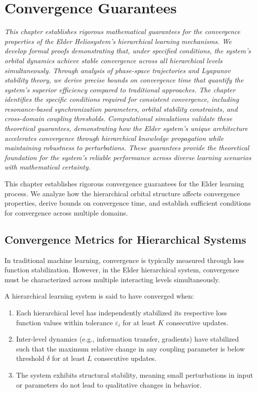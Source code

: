 \chapter{Convergence Guarantees}

\textit{This chapter establishes rigorous mathematical guarantees for the convergence properties of the Elder Heliosystem's hierarchical learning mechanisms. We develop formal proofs demonstrating that, under specified conditions, the system's orbital dynamics achieve stable convergence across all hierarchical levels simultaneously. Through analysis of phase-space trajectories and Lyapunov stability theory, we derive precise bounds on convergence time that quantify the system's superior efficiency compared to traditional approaches. The chapter identifies the specific conditions required for consistent convergence, including resonance-based synchronization parameters, orbital stability constraints, and cross-domain coupling thresholds. Computational simulations validate these theoretical guarantees, demonstrating how the Elder system's unique architecture accelerates convergence through hierarchical knowledge propagation while maintaining robustness to perturbations. These guarantees provide the theoretical foundation for the system's reliable performance across diverse learning scenarios with mathematical certainty.}

This chapter establishes rigorous convergence guarantees for the Elder learning process. We analyze how the hierarchical orbital structure affects convergence properties, derive bounds on convergence time, and establish sufficient conditions for convergence across multiple domains.

\section{Convergence Metrics for Hierarchical Systems}



In traditional machine learning, convergence is typically measured through loss function stabilization. However, in the Elder hierarchical system, convergence must be characterized across multiple interacting levels simultaneously.

\begin{definition}
A hierarchical learning system is said to have converged when:
\begin{enumerate}
    \item Each hierarchical level has independently stabilized its respective loss function values within tolerance $\varepsilon_i$ for at least $K$ consecutive updates.
    \item Inter-level dynamics (e.g., information transfer, gradients) have stabilized such that the maximum relative change in any coupling parameter is below threshold $\delta$ for at least $L$ consecutive updates.
    \item The system exhibits structural stability, meaning small perturbations in input or parameters do not lead to qualitative changes in behavior.
\end{enumerate}
\end{definition}

